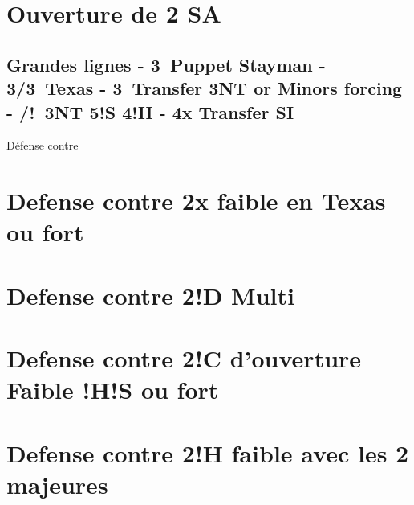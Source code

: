 \documentclass[a4paper]{article}
\begin{document}
\section{Ouverture de 2 SA}

\subsection{Grandes lignes
  - 3\pdfc\ Puppet Stayman
  - 3\pdfd/3\pdfh\ Texas
  - 3\pdfs\ Transfer 3NT or Minors forcing
  - /!\ 3NT 5!S 4!H
  - 4x Transfer SI}

Défense contre

\section{Defense contre 2x faible en Texas ou fort}

\section{Defense contre 2!D Multi}

\section{Defense contre 2!C d'ouverture Faible !H!S ou fort}

\section{Defense contre 2!H faible avec les 2 majeures
}
\end{document}
